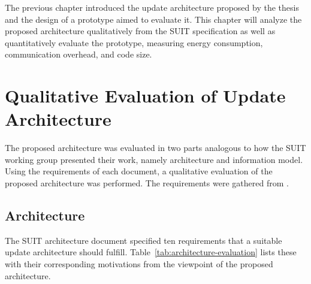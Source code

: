 \documentclass[0-thesis.tex]{subfiles}
\begin{document}
The previous chapter introduced the update architecture proposed by the thesis and the
design of a prototype aimed to evaluate it. This chapter will analyze the proposed
architecture qualitatively from the SUIT specification as well as quantitatively evaluate
the prototype, measuring energy consumption, communication overhead, and code size.

\section{Qualitative Evaluation of Update Architecture}
\label{sec:qual-evaluation}
The proposed architecture was evaluated in two parts analogous to how the SUIT working
group presented their work, namely architecture and information model. Using the
requirements of each document, a qualitative evaluation of the proposed architecture was
performed. The requirements were gathered from \parencite{suit-architecture,
suit-information-model}.

\subsection{Architecture}
\label{ssec:arch-evaluation}
The SUIT architecture document specified ten requirements that a suitable update
architecture should fulfill. Table~\ref{tab:architecture-evaluation} lists these with
their corresponding motivations from the viewpoint of the proposed architecture.
\end{document}
